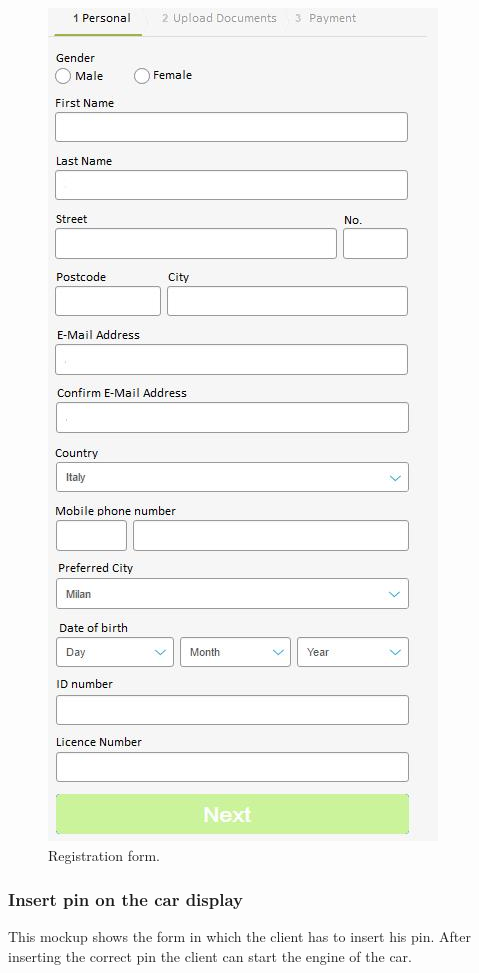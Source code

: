 \begin{figure}[hp]
\centering
\includegraphics[height=525 pt]{resources/registrazione.jpg}
\caption{\label{fig:reg}Registration form.}
\end{figure}

\newpage

\subsubsection{Insert pin on the car display} This mockup shows the form in which the client has to insert his pin. After inserting the correct pin the client can start the engine of the car.

